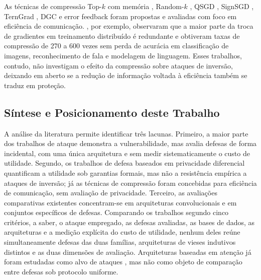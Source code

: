 As técnicas de compressão Top-$k$ com memória \cite{Stich2018}, Random-$k$ \cite{Wangni2018}, QSGD \cite{Alistarh2017}, SignSGD \cite{Bernstein2018}, TernGrad \cite{Wen2017}, DGC \cite{Lin2018} e error feedback \cite{Karimireddy2019} foram propostas e avaliadas com foco em eficiência de comunicação. , por exemplo, observaram que a maior parte da troca de gradientes em treinamento distribuído é redundante e obtiveram taxas de compressão de 270 a 600 vezes sem perda de acurácia em classificação de imagens, reconhecimento de fala e modelagem de linguagem. Esses trabalhos, contudo, não investigam o efeito da compressão sobre ataques de inversão, deixando em aberto se a redução de informação voltada à eficiência também se traduz em proteção.

\subsection{Síntese e Posicionamento deste Trabalho} \label{sec:posicionamento}

A análise da literatura permite identificar três lacunas. Primeiro, a maior parte dos trabalhos de ataque \cite{Zhu2019,Zhao2020,Geiping2020,Yin2021} demonstra a vulnerabilidade, mas avalia defesas de forma incidental, com uma única arquitetura e sem medir sistematicamente o custo de utilidade. Segundo, os trabalhos de defesa baseados em privacidade diferencial \cite{Abadi2016,McMahan2018} quantificam a utilidade sob garantias formais, mas não a resistência empírica a ataques de inversão; já as técnicas de compressão \cite{Stich2018,Wangni2018,Alistarh2017,Lin2018} foram concebidas para eficiência de comunicação, sem avaliação de privacidade. Terceiro, as avaliações comparativas existentes \cite{Wei2020,Huang2021} concentram-se em arquiteturas convolucionais e em conjuntos específicos de defesas. Comparando os trabalhos segundo cinco critérios, a saber, o ataque empregado, as defesas avaliadas, as bases de dados, as arquiteturas e a medição explícita do custo de utilidade, nenhum deles reúne simultaneamente defesas das duas famílias, arquiteturas de vieses indutivos distintos e as duas dimensões de avaliação. Arquiteturas baseadas em atenção já foram estudadas como alvo de ataques \cite{Hatamizadeh2022}, mas não como objeto de comparação entre defesas sob protocolo uniforme.

